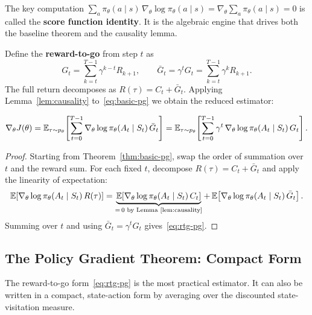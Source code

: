 \begin{remark}
The key computation $\sum_a \pi_\theta(a \mid s)\, \nabla_\theta \log \pi_\theta(a \mid s) = \nabla_\theta \sum_a \pi_\theta(a \mid s) = 0$ is called the \textbf{score function identity}.  It is the algebraic engine that drives both the baseline theorem and the causality lemma.
\end{remark}

Define the \textbf{reward-to-go} from step $t$ as
\begin{equation}
\label{eq:rtg}
G_t = \sum_{k=t}^{T-1} \gamma^{k-t} R_{k+1}, \qquad \bar G_t = \gamma^t G_t = \sum_{k=t}^{T-1} \gamma^k R_{k+1}.
\end{equation}
The full return decomposes as $R(\tau) = C_t + \bar G_t$.  Applying Lemma~\ref{lem:causality} to~\eqref{eq:basic-pg} we obtain the reduced estimator:

\begin{theorem}
\label{thm:rtg-pg}
\begin{equation}
\label{eq:rtg-pg}
\nabla_\theta J(\theta)
= \operatorname{\mathbb{E}}_{\tau \sim p_\theta}\!\left[\sum_{t=0}^{T-1} \nabla_\theta \log \pi_\theta(A_t \mid S_t)\, \bar G_t\right]
= \operatorname{\mathbb{E}}_{\tau \sim p_\theta}\!\left[\sum_{t=0}^{T-1} \gamma^t\, \nabla_\theta \log \pi_\theta(A_t \mid S_t)\, G_t\right].
\end{equation}
\end{theorem}

\begin{proof}
Starting from Theorem~\ref{thm:basic-pg}, swap the order of summation over $t$ and the reward sum.  For each fixed $t$, decompose $R(\tau) = C_t + \bar G_t$ and apply the linearity of expectation:
\[
\operatorname{\mathbb{E}}\!\left[\nabla_\theta \log \pi_\theta(A_t \mid S_t)\, R(\tau)\right]
= \underbrace{\operatorname{\mathbb{E}}\!\left[\nabla_\theta \log \pi_\theta(A_t \mid S_t)\, C_t\right]}_{=\,0 \text{ by Lemma~\ref{lem:causality}}}
+ \operatorname{\mathbb{E}}\!\left[\nabla_\theta \log \pi_\theta(A_t \mid S_t)\, \bar G_t\right].
\]
Summing over $t$ and using $\bar G_t = \gamma^t G_t$ gives~\eqref{eq:rtg-pg}.
\end{proof}

\subsection{The Policy Gradient Theorem: Compact Form}

The reward-to-go form~\eqref{eq:rtg-pg} is the most practical estimator.  It can also be written in a compact, state-action form by averaging over the discounted state-visitation measure.

